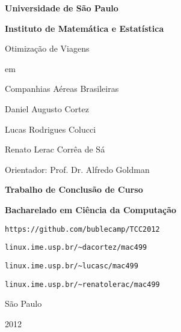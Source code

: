 \thispagestyle{empty}

\begin{center}

{\Large \bf Universidade de São Paulo}

\vspace{0.2cm}

{\Large \bf Instituto de Matemática e Estatística}

\vspace{3.0cm}

{\Large \sc Otimização de Viagens}

\vspace{0.2cm}

{\Large \sc em}

\vspace{0.2cm}

{\Large \sc Companhias Aéreas Brasileiras}

\vspace{2.0cm}

{\large Daniel Augusto Cortez}

{\large Lucas Rodrigues Colucci}

{\large Renato Lerac Corrêa de Sá}

\end{center}

\vspace{1.0cm}

\begin{flushright}
{\large Orientador: Prof. Dr. Alfredo Goldman}
\end{flushright}

\begin{center}
	
\vspace{2.0cm}

{\large \bf Trabalho de Conclusão de Curso}

{\large \bf Bacharelado em Ciência da Computação}

\vspace{1.0cm}

{\large \verb|https://github.com/bublecamp/TCC2012|}

{\large \verb|linux.ime.usp.br/~dacortez/mac499|}

{\large \verb|linux.ime.usp.br/~lucasc/mac499|}

{\large \verb|linux.ime.usp.br/~renatolerac/mac499|}

\vfill
	
{\large São Paulo}

{\large 2012}

\end{center}

